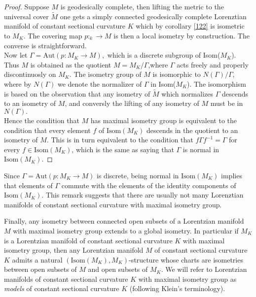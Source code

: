\begin{proof}
    Suppose $M$ is geodesically complete, then lifting the metric to the universal cover $\tilde{M}$ one gets a simply connected geodesically complete Lorenztian manifold of constant sectional curvature $K$ which by corollary \ref{122} is isometric to $M_K$. The covering map $p:_k\to M$ is then a local isometry by construction. The converse is straightforward. \\   
    Now let $\Gamma=\text{Aut}(p:M_K\to M),$ which is a discrete subgroup of Isom($M_K$). Thus $M$ is obtained as the quotient $M=M_{K}/\Gamma$,where $\Gamma$ acts freely and properly discontinuosly on $M_K$. The isometry group of $M$ is isomorphic to $N(\Gamma)/\Gamma$, where by $N(\Gamma)$ we denote the normalizer of $\Gamma$ in Isom($M_K$). The isomorphism is based on the observation that any isometry of $\tilde{M}$ which normalizes $\Gamma$ descends to an isometry of $M$, and conversly the lifting of any isometry of $M$ must be in $N(\Gamma).$\\
    Hence the condition that $M$ has maximal isometry group is equivalent to the condition that every element $f$ of $\text{Isom}(M_K)$ descends in the quotient to an isometry of $M$. This is in turn equivalent to the condition that $f\Gamma f^{-1}=\Gamma$ for every $f\in \text{Isom}(M_K)$, which is the same as saying that $\Gamma$ is normal in $\text{Isom}(M_K)$.
\end{proof}

\begin{observation}
Since $\Gamma=\text{Aut}(p:M_K\to M)$ is discrete, being normal in $\text{Isom}(M_K)$ implies that elements of $\Gamma$ commute with the elements of the identity components of $\text{Isom}(M_K)$. This remark suggests that there are usually not many Lorenztian manifolds of constant sectional curvature with maximal isometry group.
\end{observation}

Finally, any isometry between connected open subsets of a Lorentzian manifold $M$ with maximal isometry group extends to a global isometry. In particular if $M_K$ is a Lorentzian manifold of constant sectional curvature $K$ with maximal isometry group, then any Lorentzian manifold $M$ of constant sectional curvature $K$ admits a natural $(\text{Isom}(M_K), M_K)$-structure whose charts are isometries between open subsets of $M$ and open subsets of $M_K$. We will refer to Lorentzian manifolds of constant sectional curvature $K$ with maximal isometry group as \textit{models} of constant sectional curvature $K$ (following Klein's terminology).  